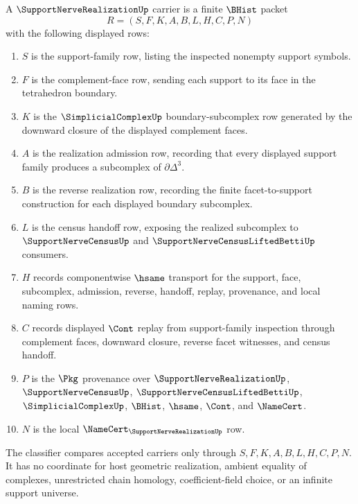 \begin{definition}
\label{def:support-nerve-realization-carrier}
A $\SupportNerveRealizationUp$ carrier is a finite $\BHist$ packet
$$
R=(S,F,K,A,B,L,H,C,P,N)
$$
with the following displayed rows:
\begin{enumerate}
\item $S$ is the support-family row, listing the inspected nonempty support symbols.
\item $F$ is the complement-face row, sending each support to its face in the tetrahedron boundary.
\item $K$ is the $\SimplicialComplexUp$ boundary-subcomplex row generated by the downward closure of the displayed complement faces.
\item $A$ is the realization admission row, recording that every displayed support family produces a subcomplex of $\partial\Delta^3$.
\item $B$ is the reverse realization row, recording the finite facet-to-support construction for each displayed boundary subcomplex.
\item $L$ is the census handoff row, exposing the realized subcomplex to $\SupportNerveCensusUp$ and $\SupportNerveCensusLiftedBettiUp$ consumers.
\item $H$ records componentwise $\hsame$ transport for the support, face, subcomplex, admission, reverse, handoff, replay, provenance, and local naming rows.
\item $C$ records displayed $\Cont$ replay from support-family inspection through complement faces, downward closure, reverse facet witnesses, and census handoff.
\item $P$ is the $\Pkg$ provenance over $\SupportNerveRealizationUp$, $\SupportNerveCensusUp$, $\SupportNerveCensusLiftedBettiUp$, $\SimplicialComplexUp$, $\BHist$, $\hsame$, $\Cont$, and $\NameCert$.
\item $N$ is the local $\NameCert_{\SupportNerveRealizationUp}$ row.
\end{enumerate}
The classifier compares accepted carriers only through $S,F,K,A,B,L,H,C,P,N$. It has no coordinate for host geometric realization, ambient equality of complexes, unrestricted chain homology, coefficient-field choice, or an infinite support universe.
\end{definition}

